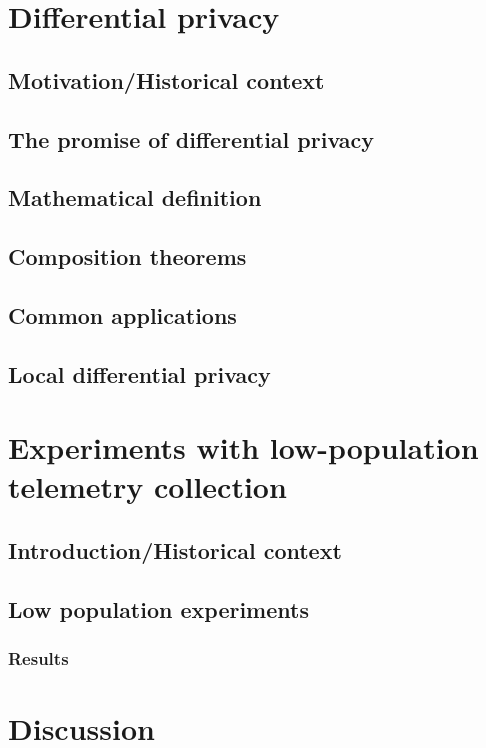 \section{Differential privacy}

\subsection{Motivation/Historical context}

\subsection{The promise of differential privacy}

\subsection{Mathematical definition}

\subsection{Composition theorems}

\subsection{Common applications}

\subsection{Local differential privacy}

\section{Experiments with low-population telemetry collection}

\subsection{Introduction/Historical context}

\subsection{Low population experiments}

\subsubsection{Results}

\section{Discussion}



